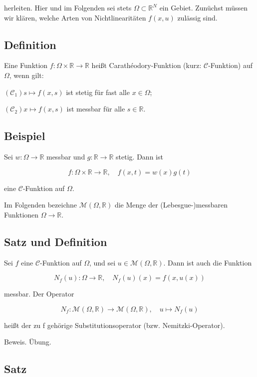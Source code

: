 \documentclass[10pt, letterpaper]{article}
\begin{document}
herleiten. Hier und im Folgenden sei stets $\Omega \subset \mathbb{R}^{N}$ ein Gebiet. Zunüchst müssen wir klären, welche Arten von Nichtlinearitäten $f(x, u)$ zulässig sind.

\subsection*{Definition}

Eine Funktion $f: \Omega \times \mathbb{R} \rightarrow \mathbb{R}$ heißt Carathéodory-Funktion (kurz: $\mathcal{C}$-Funktion) auf $\Omega$, wenn gilt:

$\left(\mathcal{C}_{1}\right) s \mapsto f(x, s)$ ist stetig für fast alle $x \in \Omega$;

$\left(\mathcal{C}_{2}\right) x \mapsto f(x, s)$ ist messbar für alle $s \in \mathbb{R}$.

\subsection*{Beispiel}

Sei $w: \Omega \rightarrow \mathbb{R}$ messbar und $g: \mathbb{R} \rightarrow \mathbb{R}$ stetig. Dann ist

$$
f: \Omega \times \mathbb{R} \rightarrow \mathbb{R}, \quad f(x, t)=w(x) g(t)
$$

eine $\mathcal{C}$-Funktion auf $\Omega$.

Im Folgenden bezeichne $\mathcal{M}(\Omega, \mathbb{R})$ die Menge der (Lebesgue-)messbaren Funktionen $\Omega \rightarrow \mathbb{R}$.

\subsection*{Satz und Definition}

Sei $f$ eine $\mathcal{C}$-Funktion auf $\Omega$, und sei $u \in \mathcal{M}(\Omega, \mathbb{R})$. Dann ist auch die Funktion

$$
N_{f}(u): \Omega \rightarrow \mathbb{R}, \quad N_{f}(u)(x)=f(x, u(x))
$$

messbar. Der Operator

$$
N_{f}: \mathcal{M}(\Omega, \mathbb{R}) \rightarrow \mathcal{M}(\Omega, \mathbb{R}), \quad u \mapsto N_{f}(u)
$$

heißt der zu f gehörige Substitutionsoperator (bzw. Nemitzki-Operator).

Beweis. Übung.

\subsection*{Satz}
\end{document}

